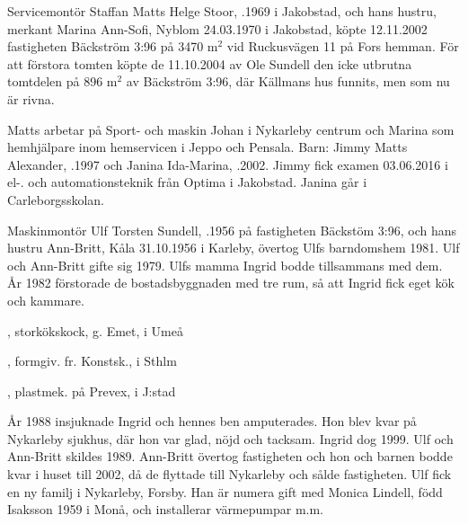
%
Servicemontör Staffan Matts Helge Stoor, .1969 i Jakobstad,	och hans hustru, merkant  Marina Ann-Sofi, \textborn Nyblom 24.03.1970 i Jakobstad, köpte 12.11.2002 fastigheten Bäckström 3:96 på 3470	m$^2$  vid Ruckusvägen 11 på Fors hemman. För att förstora tomten köpte de 11.10.2004 av Ole Sundell den icke utbrutna tomtdelen på 896 m$^2$ av Bäckström 3:96, där Källmans hus funnits, men som nu är rivna.

Matts arbetar på Sport- och maskin Johan i Nykarleby centrum och 	Marina som hemhjälpare inom hemservicen i Jeppo och Pensala.	Barn:	Jimmy Matts Alexander, .1997	och Janina Ida-Marina,	.2002.	Jimmy fick examen 03.06.2016 i el-. och automationsteknik från 	Optima i Jakobstad. Janina går i Carleborgsskolan.


%
Maskinmontör Ulf Torsten Sundell, .1956 på fastigheten Bäckstöm 3:96, och hans hustru Ann-Britt, \textborn Kåla 31.10.1956 i Karleby, övertog Ulfs barndomshem 1981. Ulf och Ann-Britt gifte sig 1979. Ulfs mamma Ingrid bodde tillsammans med dem. År 1982 förstorade de bostadsbyggnaden med tre rum, så att Ingrid fick eget kök och kammare.
\begin{jhchildren}
  \item {}, storkökskock, g. Emet, i Umeå
  \item {}, formgiv. fr. Konstsk., i Sthlm
  \item {}, plastmek. på Prevex, i J:stad
\end{jhchildren}

År 1988 insjuknade Ingrid och hennes ben amputerades. Hon blev kvar på Nykarleby sjukhus, där hon var glad, nöjd och tacksam. Ingrid dog 	1999. Ulf och Ann-Britt skildes 1989. Ann-Britt övertog fastigheten och	hon och barnen bodde kvar i huset till 2002, då de flyttade till Nykarleby och sålde fastigheten. Ulf fick en ny familj i Nykarleby, Forsby. Han är numera gift med Monica Lindell, född Isaksson 1959 i Monå, och installerar värmepumpar m.m.


